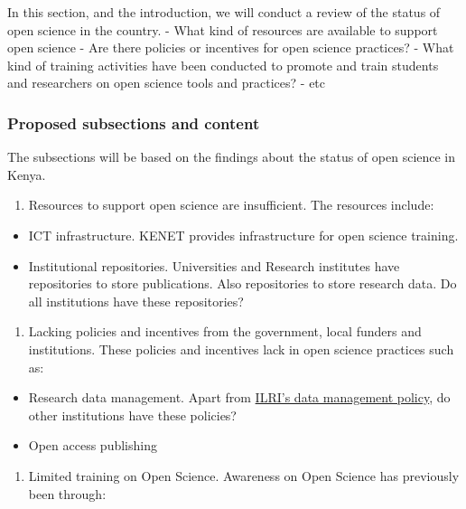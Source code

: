 In this section, and the introduction, we will conduct a review of the
status of open science in the country. - What kind of resources are
available to support open science - Are there policies or incentives for
open science practices? - What kind of training activities have been
conducted to promote and train students and researchers on open science
tools and practices? - etc

\subsubsection{Proposed subsections and
content}\label{proposed-subsections-and-content}

The subsections will be based on the findings about the status of open
science in Kenya.

\begin{enumerate}
\def\labelenumi{\arabic{enumi}.}
\tightlist
\item
  Resources to support open science are insufficient. The resources
  include:
\end{enumerate}

\begin{itemize}
\tightlist
\item
  ICT infrastructure. KENET provides infrastructure for open science
  training.
\item
  Institutional repositories. Universities and Research institutes have
  repositories to store publications. Also repositories to store
  research data. Do all institutions have these repositories?
\end{itemize}

\begin{enumerate}
\def\labelenumi{\arabic{enumi}.}
\setcounter{enumi}{1}
\tightlist
\item
  Lacking policies and incentives from the government, local funders and
  institutions. These policies and incentives lack in open science
  practices such as:
\end{enumerate}

\begin{itemize}
\tightlist
\item
  Research data management. Apart from
  \href{https://cgspace.cgiar.org/handle/10568/63496}{ILRI's data
  management policy}, do other institutions have these policies?
\item
  Open access publishing
\end{itemize}

\begin{enumerate}
\def\labelenumi{\arabic{enumi}.}
\setcounter{enumi}{2}
\tightlist
\item
  Limited training on Open Science. Awareness on Open Science has
  previously been through:
\end{enumerate}

